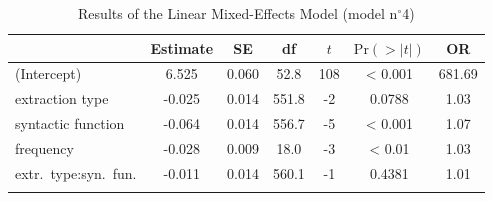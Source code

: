 \begin{table}
\begin{tabularx}{\textwidth}{Q S[table-format=-1.3] S[table-format=1.3] S[table-format=3.1] S[table-format=-3] S[table-format=<1.4] S[table-format=3.2] }
  \lsptoprule
 & {Estimate} & {SE} & {df} & {$t$} & {$\text{Pr}(>|t|)$} & {OR} \\ 
  \midrule
(Intercept) & 6.525 & 0.060 & 52.8 & 108 & < 0.001 & 681.69 \\ 
  extraction type & -0.025 & 0.014 & 551.8 & -2 & 0.0788 & 1.03 \\ 
  syntactic function & -0.064 & 0.014 & 556.7 & -5 & < 0.001 & 1.07 \\ 
  frequency & -0.028 & 0.009 & 18.0 & -3 & < 0.01 & 1.03 \\ 
  extr.\ type:syn.\ fun. & -0.011 & 0.014 & 560.1 & -1 & 0.4381 & 1.01 \\ 
   \lspbottomrule
\end{tabularx}
\caption{Results of the Linear Mixed-Effects Model (model n$^{\circ}$4)}
\label{tab:exp09-m4}
\end{table}
